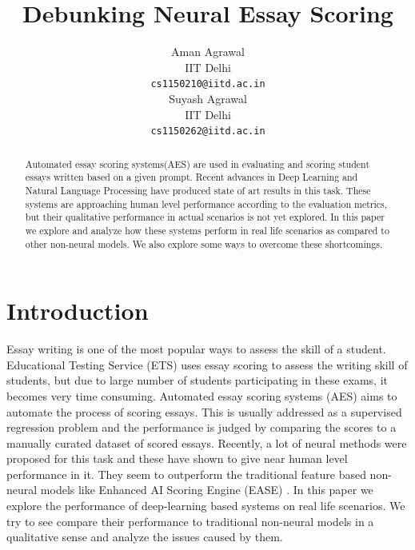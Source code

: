 \documentclass[11pt,a4paper]{article}
\title{Debunking Neural Essay Scoring}
\author{Aman Agrawal \\
  IIT Delhi \\
  {\tt cs1150210@iitd.ac.in} \\\And
  Suyash Agrawal \\
  IIT Delhi \\
  {\tt cs1150262@iitd.ac.in} \\}
\date{}
\begin{document}
\maketitle
\begin{abstract}
  Automated essay scoring systems(AES) are used in evaluating and scoring student essays written based on a given prompt. Recent advances in Deep Learning and Natural Language Processing have produced state of art results in this task. These systems are approaching human level performance according to the evaluation metrics, but their qualitative performance in actual scenarios is not yet explored. In this paper we explore and analyze how these systems perform in real life scenarios as compared to other non-neural models. We also explore some ways to overcome these shortcomings.
\end{abstract}

\section{Introduction}


Essay writing is one of the most popular ways to assess the skill of a student. Educational Testing Service (ETS)\cite{ets} uses essay scoring to assess the writing skill of students, but due to large number of students participating in these exams, it becomes very time consuming.
Automated essay scoring systems (AES) aims to automate the process of scoring essays. This is usually addressed as a supervised regression problem and the performance is judged by comparing the scores to a manually curated dataset of scored essays.
Recently, a lot of neural methods were proposed for this task and these have shown to give near human level performance in it. They seem to outperform the traditional feature based non-neural models like Enhanced AI Scoring Engine (EASE) \cite{ease}.
In this paper we explore the performance of deep-learning based systems on real life scenarios. We try to see compare their performance to traditional non-neural models in a qualitative sense and analyze the issues caused by them.
\end{document}
